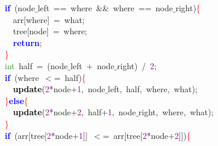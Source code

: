\mbox{}\ \ \textbf{\textcolor{Blue}{if}}\ \textcolor{BrickRed}{(}node$\_$left\ \textcolor{BrickRed}{==}\ where\ \textcolor{BrickRed}{\&\&}\ where\ \textcolor{BrickRed}{==}\ node$\_$right\textcolor{BrickRed}{)}\textcolor{Red}{\{} \\
\mbox{}\ \ \ \ arr\textcolor{BrickRed}{[}where\textcolor{BrickRed}{]}\ \textcolor{BrickRed}{=}\ what\textcolor{BrickRed}{;} \\
\mbox{}\ \ \ \ tree\textcolor{BrickRed}{[}node\textcolor{BrickRed}{]}\ \textcolor{BrickRed}{=}\ where\textcolor{BrickRed}{;} \\
\mbox{}\ \ \ \ \textbf{\textcolor{Blue}{return}}\textcolor{BrickRed}{;} \\
\mbox{}\ \ \textcolor{Red}{\}} \\
\mbox{}\ \ \textcolor{ForestGreen}{int}\ half\ \textcolor{BrickRed}{=}\ \textcolor{BrickRed}{(}node$\_$left\ \textcolor{BrickRed}{+}\ node$\_$right\textcolor{BrickRed}{)}\ \textcolor{BrickRed}{/}\ \textcolor{Purple}{2}\textcolor{BrickRed}{;} \\
\mbox{}\ \ \textbf{\textcolor{Blue}{if}}\ \textcolor{BrickRed}{(}where\ \textcolor{BrickRed}{$<$=}\ half\textcolor{BrickRed}{)}\textcolor{Red}{\{} \\
\mbox{}\ \ \ \ \textbf{\textcolor{Black}{update}}\textcolor{BrickRed}{(}\textcolor{Purple}{2}\textcolor{BrickRed}{*}node\textcolor{BrickRed}{+}\textcolor{Purple}{1}\textcolor{BrickRed}{,}\ node$\_$left\textcolor{BrickRed}{,}\ half\textcolor{BrickRed}{,}\ where\textcolor{BrickRed}{,}\ what\textcolor{BrickRed}{);} \\
\mbox{}\ \ \textcolor{Red}{\}}\textbf{\textcolor{Blue}{else}}\textcolor{Red}{\{} \\
\mbox{}\ \ \ \ \textbf{\textcolor{Black}{update}}\textcolor{BrickRed}{(}\textcolor{Purple}{2}\textcolor{BrickRed}{*}node\textcolor{BrickRed}{+}\textcolor{Purple}{2}\textcolor{BrickRed}{,}\ half\textcolor{BrickRed}{+}\textcolor{Purple}{1}\textcolor{BrickRed}{,}\ node$\_$right\textcolor{BrickRed}{,}\ where\textcolor{BrickRed}{,}\ what\textcolor{BrickRed}{);} \\
\mbox{}\ \ \textcolor{Red}{\}} \\
\mbox{}\ \ \textbf{\textcolor{Blue}{if}}\ \textcolor{BrickRed}{(}arr\textcolor{BrickRed}{[}tree\textcolor{BrickRed}{[}\textcolor{Purple}{2}\textcolor{BrickRed}{*}node\textcolor{BrickRed}{+}\textcolor{Purple}{1}\textcolor{BrickRed}{]]}\ \textcolor{BrickRed}{$<$=}\ arr\textcolor{BrickRed}{[}tree\textcolor{BrickRed}{[}\textcolor{Purple}{2}\textcolor{BrickRed}{*}node\textcolor{BrickRed}{+}\textcolor{Purple}{2}\textcolor{BrickRed}{]])}\textcolor{Red}{\{} \\
